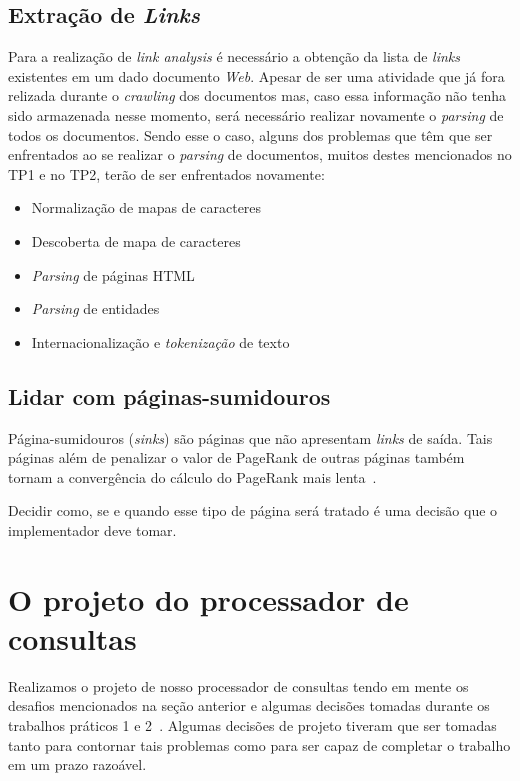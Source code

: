 \documentclass[10pt,twocolumn]{article}
\begin{document}
\subsection{Extração de \emph{Links}}

Para a realização de \emph{link analysis} é necessário a obtenção da
lista de \emph{links} existentes em um dado documento \emph{Web}.
Apesar de ser uma atividade que já fora relizada durante o
\emph{crawling} dos documentos mas, caso essa informação não tenha sido
armazenada nesse momento, será necessário realizar novamente o
\emph{parsing} de todos os documentos. Sendo esse o caso, alguns dos
problemas que têm que ser enfrentados ao se realizar o \emph{parsing} de
documentos, muitos destes mencionados no TP1 e no TP2, terão de ser
enfrentados novamente:
\begin{itemize}
\item Normalização de mapas de caracteres
\item Descoberta de mapa de caracteres
\item \emph{Parsing} de páginas HTML
\item \emph{Parsing} de entidades
\item Internacionalização e \emph{tokenização} de texto
\end{itemize}

\subsection{Lidar com páginas-sumidouros}

Página-sumidouros (\emph{sinks}) são páginas que não apresentam
\emph{links} de saída. Tais páginas além de penalizar o valor de
PageRank de outras páginas também tornam a convergência do cálculo do
PageRank mais lenta~\cite{haveliwala99efficient, page98pagerank}.

Decidir como, se e quando esse tipo de página será tratado é uma decisão
que o implementador deve tomar.


\section{O projeto do processador de consultas}\label{sec:projeto}

Realizamos o projeto de nosso processador de consultas tendo em mente os desafios
mencionados na seção anterior e algumas decisões tomadas durante os
trabalhos práticos 1 e 2~\cite{tp1,tp2}. Algumas decisões de projeto tiveram que
ser tomadas tanto para contornar tais problemas como para ser capaz de
completar o trabalho em um prazo razoável.
\end{document}
